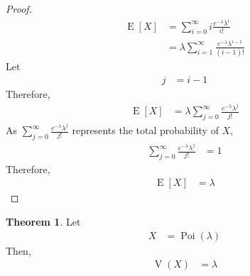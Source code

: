 \documentclass[titlepage, fleqn, a4paper, 12pt, twoside]{article}
\theoremstyle{definition}
\theoremstyle{theorem}
\newtheorem{theorem}{Theorem}
\DeclareMathOperator{\expct}{\mathrm{E}}
\DeclareMathOperator{\var}{\mathrm{V}}
\DeclareMathOperator{\poi}{\mathrm{Poi}}
\begin{document}
\begin{proof}
	\begin{align*}
		\expct[X] & = \sum\limits_{i = 0}^{\infty} i \frac{e^{-\lambda} \lambda^i}{i!} \\
                          & = \lambda \sum\limits_{i = 1}^{\infty} \frac{e^{-\lambda} \lambda^{i - 1}}{(i - 1)!}
	\end{align*}
	Let
	\begin{align*}
		j & = i - 1
	\end{align*}
	Therefore,
	\begin{align*}
		\expct[X] & = \lambda \sum\limits_{j = 0}^{\infty} \frac{e^{-\lambda} \lambda^j}{j!}
	\end{align*}
	As $\sum\limits_{j = 0}^{\infty} \frac{e^{-\lambda} \lambda^j}{j!}$ represents the total probability of $X$,
	\begin{align*}
		\sum\limits_{j = 0}^{\infty} \frac{e^{-\lambda} \lambda^j}{j!} & = 1
	\end{align*}
	Therefore,
	\begin{align*}
		\expct[X] & = \lambda
	\end{align*}
\end{proof}

\begin{theorem}
	Let
	\begin{align*}
		X & = \poi(\lambda)
	\end{align*}
	Then,
	\begin{align*}
		\var(X) & = \lambda
	\end{align*}
\end{theorem}
\end{document}
